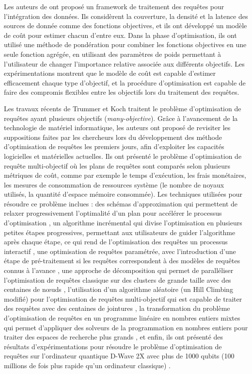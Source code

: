 Les auteurs de \cite{Fan06} ont proposé un framework de traitement des requêtes pour l'intégration des données. Ils considèrent la couverture, la densité et la latence des sources de donnée comme des fonctions objectives, et ils ont développé un modèle de coût pour estimer chacun d'entre eux.
Dans la phase d'optimisation, ils ont utilisé une méthode de pondération pour combiner les fonctions objectives en une seule fonction agrégée, en utilisant des paramètres de poids permettant à l'utilisateur de changer l'importance relative associée aux différents objectifs. Les expérimentations montrent que le modèle de coût est capable d'estimer efficacement chaque type d'objectif, et la procédure d'optimisation est capable de faire des compromis flexibles entre les objectifs lors du traitement des requêtes.

Les travaux récents de Trummer et Koch traitent le problème d'optimisation de requêtes ayant plusieurs objectifs (\textit{many-objective}). Grâce à l'avancement de la technologie de matériel informatique, les auteurs ont proposé de revisiter les suppositions faites par les chercheurs lors du développement des méthode d'optimisation de requêtes les premiers jours, afin d'exploiter les capacités logicielles et matérielles actuelles. Ils ont présenté le problème d'optimisation de requête multi-objectif où les plans de requêtes sont comparés selon plusieurs métriques de coût, comme par exemple le temps d'exécution, les frais monétaires, les mesures de consommation de ressources système (le nombre de noyaux utilisés, la quantité d'espace mémoire consommée). Les techniques utilisées pour résoudre ce problème inclues : des schémas d'approximation qui permettent de relaxer progressivement l'optimalité d'un plan pour accélérer le processus d'optimisation \cite{Trummer14b}, un algorithme incrémental qui divise l'optimisation en plusieurs petites étapes progressives, permettant aux utilisateurs de guider l'algorithme après chaque étape, ce qui rend de l'optimisation des requêtes un processus interactif \cite{Trummer15}, une optimisation de requêtes paramétrée, avec l'introduction d'une étape de pré-traitement si les requêtes correspondent à des modèles de requêtes connus à l'avance \cite{Trummer14}, une approche de décomposition qui permet de paralléliser l'optimisation de requêtes classique sur des clusters de grande taille avec des centaines de nœuds \cite{Trummer16}, l'utilisation d'un algorithme aléatoire (un Hill Climbing modifié) pour l'optimisation de requêtes multi-objectif qui est capable de traiter des requêtes avec des centaines de jointures \cite{Trummer16b}, la transformation du problème d'optimisation de requêtes en un programme linéaire en nombres entiers mixtes qui permet d'appliquer des solveurs de la programmation en nombres entiers pour traiter des espaces de recherche plus grands \cite{Trummer15b}, et enfin, ils ont présenté des résultats d'expérimentations pour résoudre le problème d'optimisation de requêtes sur l'ordinateur quantique D-Wave 2X avec plus de 1000 qubits (100 millions de fois plus rapide qu'un ordinateur classique) \cite{Trummer16c}.

